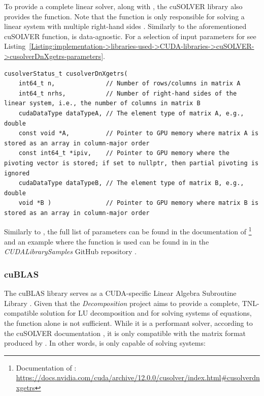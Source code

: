 To provide a complete linear solver, along with , the cuSOLVER library also provides the  function.
Note that the function is only responsible for solving a linear system with multiple right-hand sides \cite{5D33zKi5iStCty0r}.
Similarly to the aforementioned cuSOLVER function,  is data-agnostic.
For a selection of input parameters for  see Listing~\ref{Listing:implementation->libraries-used->CUDA-libraries->cuSOLVER->cusolverDnXgetrs-parameters}.

\begin{lstlisting}[caption={The function declaration of \code{cusolverDnXgetrs()} with a selection of parameters.
Note that matrix \code{A} should adhere to the format of the matrix produced by \code{cusolverDnXgetrf()} \cite{5D33zKi5iStCty0r}.},label={Listing:implementation->libraries-used->CUDA-libraries->cuSOLVER->cusolverDnXgetrs-parameters}]
cusolverStatus_t cusolverDnXgetrs(
	int64_t n,              // Number of rows/columns in matrix A
	int64_t nrhs,           // Number of right-hand sides of the linear system, i.e., the number of columns in matrix B
	cudaDataType dataTypeA, // The element type of matrix A, e.g., double
	const void *A,          // Pointer to GPU memory where matrix A is stored as an array in column-major order
	const int64_t *ipiv,    // Pointer to GPU memory where the pivoting vector is stored; if set to nullptr, then partial pivoting is ignored
	cudaDataType dataTypeB, // The element type of matrix B, e.g., double
	void *B )               // Pointer to GPU memory where matrix B is stored as an array in column-major order
\end{lstlisting}

Similarly to , the full list of parameters can be found in the documentation of \footnote{Documentation of : \url{https://docs.nvidia.com/cuda/archive/12.0.0/cusolver/index.html\#cusolverdnxgetrs}} \cite{5D33zKi5iStCty0r} and an example where the function is used can be found in  in the \textit{CUDALibrarySamples} GitHub repository \cite{Nicely2023}.

\subsubsection{cuBLAS}\label{Subsection:implementation->libraries-used->CUDA-libraries->cuBLAS}
The cuBLAS library serves as a CUDA-specific Linear Algebra Subroutine Library \cite{h9oJtLLHaTFaL3ME}.
Given that the \textit{Decomposition} project aims to provide a complete, TNL-compatible solution for LU decomposition and for solving systems of equations, the  function alone is not sufficient.
While it is a performant solver, according to the cuSOLVER documentation \cite{5D33zKi5iStCty0r}, it is only compatible with the matrix format produced by .
In other words,  is only capable of solving systems:

